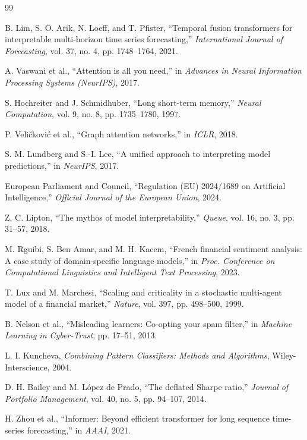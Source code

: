 \documentclass[conference]{IEEEtran}
\begin{document}
\begin{thebibliography}{99}

B. Lim, S. Ö. Arik, N. Loeff, and T. Pfister, ``Temporal fusion transformers for interpretable multi-horizon time series forecasting,'' \textit{International Journal of Forecasting}, vol. 37, no. 4, pp. 1748--1764, 2021.

A. Vaswani et al., ``Attention is all you need,'' in \textit{Advances in Neural Information Processing Systems (NeurIPS)}, 2017.

S. Hochreiter and J. Schmidhuber, ``Long short-term memory,'' \textit{Neural Computation}, vol. 9, no. 8, pp. 1735--1780, 1997.

P. Veličković et al., ``Graph attention networks,'' in \textit{ICLR}, 2018.

S. M. Lundberg and S.-I. Lee, ``A unified approach to interpreting model predictions,'' in \textit{NeurIPS}, 2017.

European Parliament and Council, ``Regulation (EU) 2024/1689 on Artificial Intelligence,'' \textit{Official Journal of the European Union}, 2024.

Z. C. Lipton, ``The mythos of model interpretability,'' \textit{Queue}, vol. 16, no. 3, pp. 31--57, 2018.

M. Rguibi, S. Ben Amar, and M. H. Kacem, ``French financial sentiment analysis: A case study of domain-specific language models,'' in \textit{Proc. Conference on Computational Linguistics and Intelligent Text Processing}, 2023.

T. Lux and M. Marchesi, ``Scaling and criticality in a stochastic multi-agent model of a financial market,'' \textit{Nature}, vol. 397, pp. 498--500, 1999.

B. Nelson et al., ``Misleading learners: Co-opting your spam filter,'' in \textit{Machine Learning in Cyber-Trust}, pp. 17--51, 2013.

L. I. Kuncheva, \textit{Combining Pattern Classifiers: Methods and Algorithms}, Wiley-Interscience, 2004.

D. H. Bailey and M. López de Prado, ``The deflated Sharpe ratio,'' \textit{Journal of Portfolio Management}, vol. 40, no. 5, pp. 94--107, 2014.

H. Zhou et al., ``Informer: Beyond efficient transformer for long sequence time-series forecasting,'' in \textit{AAAI}, 2021.


\end{thebibliography}
\end{document}
